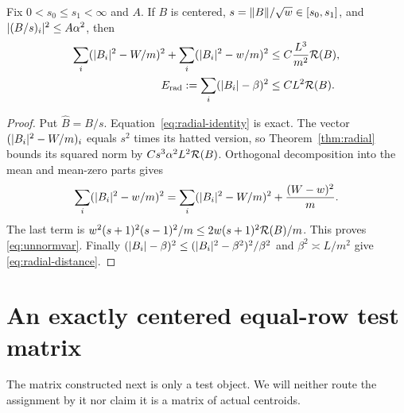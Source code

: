 \begin{corollary}\label{cor:unnormalized}
Fix $0<s_0\le s_1<\infty$ and $A$. If $B$ is centered,
$s=\lVert B\rVert/\sqrt w\in[s_0,s_1]$, and
$\lvert (B/s)_i\rvert^2\le A\alpha^2$, then
\begin{align}
 \sum_i(\lvert B_i\rvert^2-W/m)^2+
 \sum_i(\lvert B_i\rvert^2-w/m)^2
                  &\le C\frac{L^3}{m^2}\mathcal R(B),\label{eq:unnormvar}\\
 E_{\rm rad}:=\sum_i(\lvert B_i\rvert-\beta)^2
                  &\le CL^2\mathcal R(B).\label{eq:radial-distance}
\end{align}
\end{corollary}
\begin{proof}
Put $\widehat B=B/s$. Equation~\eqref{eq:radial-identity} is exact.
The vector $(\lvert B_i\rvert^2-W/m)_i$ equals $s^2$ times its hatted version,
so Theorem~\ref{thm:radial} bounds its squared norm by
$Cs^3\alpha^2L^2\mathcal R(B)$. Orthogonal decomposition into the mean and
mean-zero parts gives
\[
 \sum_i(\lvert B_i\rvert^2-w/m)^2
  =\sum_i(\lvert B_i\rvert^2-W/m)^2+\frac{(W-w)^2}{m}.
\]
The last term is
$w^2(s+1)^2(s-1)^2/m\le2w(s+1)^2\mathcal R(B)/m$.
This proves \eqref{eq:unnormvar}. Finally
$(\lvert B_i\rvert-\beta)^2\le(\lvert B_i\rvert^2-\beta^2)^2/\beta^2$
and $\beta^2\asymp L/m^2$ give \eqref{eq:radial-distance}.
\end{proof}

\section{An exactly centered equal-row test matrix}\label{sec:proxy}
The matrix constructed next is only a test object. We will neither
route the assignment by it nor claim it is a matrix of actual centroids.

